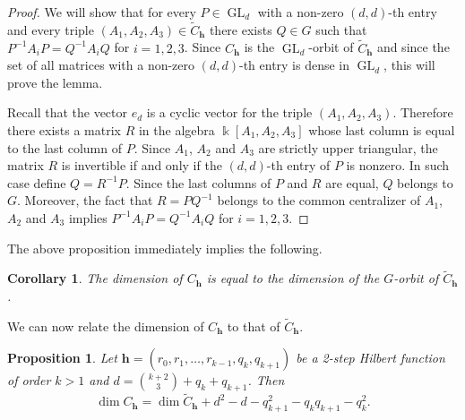 \documentclass[11pt]{amsart}
\newtheorem{prop}[thm]{Proposition}
\newtheorem{cor}[thm]{Corollary}
\theoremstyle{definition}
\DeclareMathOperator{\GL}{GL}
\newcommand{\kk}{\Bbbk}
\newcommand{\h}{\mathbf{h}}
\newcommand{\tC}{\widetilde{C}}
\begin{document}
\begin{proof}
We will show that for every $P\in \GL_d$ with a non-zero $(d,d)$-th entry and every triple $(A_1,A_2,A_3)\in \tC_\h$ there exists $Q\in G$ such that $P^{-1}A_iP=Q^{-1}A_iQ$ for $i=1,2,3$. Since $C_\h$ is the $\GL_d$-orbit of $\tC_\h$ and since the set of all matrices with a non-zero $(d,d)$-th entry is dense in $\GL_d$, this will prove the lemma.

Recall that the vector $e_d$ is a cyclic vector for the triple $(A_1,A_2,A_3)$. Therefore there exists a matrix $R$ in the algebra $\kk[A_1,A_2,A_3]$ whose last column is equal to the last column of $P$. Since $A_1$, $A_2$ and $A_3$ are strictly upper triangular, the matrix $R$ is invertible if and only if the $(d,d)$-th entry of $P$ is nonzero. In such case define $Q=R^{-1}P$. Since the last columns of $P$ and $R$ are equal, $Q$ belongs to $G$. Moreover, the fact that $R=PQ^{-1}$ belongs to the common centralizer of $A_1$, $A_2$ and $A_3$ implies $P^{-1}A_iP=Q^{-1}A_iQ$ for $i=1,2,3$.
\end{proof}

The above proposition immediately implies the following.

\begin{cor}\label{cor: dimension of G-orbit}
The dimension of $C_\h$ is equal to the dimension of the $G$-orbit of $\tC_\h$.
\end{cor}

We can now relate the dimension of $C_\h$ to that of $\tC_\h$.

\begin{prop}\label{prop: dim of stabilizer}
Let $\h=(r_0,r_1,\ldots ,r_{k-1},q_k,q_{k+1})$ be a 2-step Hilbert function of order $k>1$ and $d={k+2\choose 3}+q_k+q_{k+1}$. Then
$$\dim C_\h=\dim \tC_\h+d^2-d-q_{k+1}^2-q_kq_{k+1}-q_k^2.$$
\end{prop}
\end{document}

